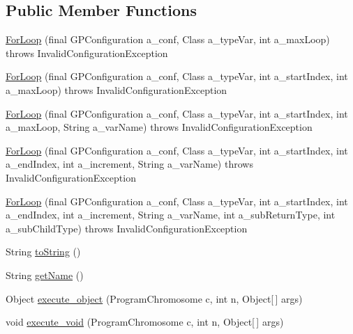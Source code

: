 \subsection*{Public Member Functions}
\begin{DoxyCompactItemize}
\item 
\hyperlink{classorg_1_1jgap_1_1gp_1_1function_1_1_for_loop_a3e802fb1995150059fbb2ac6d8661cb0}{For\-Loop} (final G\-P\-Configuration a\-\_\-conf, Class a\-\_\-type\-Var, int a\-\_\-max\-Loop)  throws Invalid\-Configuration\-Exception 
\item 
\hyperlink{classorg_1_1jgap_1_1gp_1_1function_1_1_for_loop_a634098a0999d8b32e74b2c2cf35bb353}{For\-Loop} (final G\-P\-Configuration a\-\_\-conf, Class a\-\_\-type\-Var, int a\-\_\-start\-Index, int a\-\_\-max\-Loop)  throws Invalid\-Configuration\-Exception 
\item 
\hyperlink{classorg_1_1jgap_1_1gp_1_1function_1_1_for_loop_a752407b157c1e04b58d9743bcadde2b2}{For\-Loop} (final G\-P\-Configuration a\-\_\-conf, Class a\-\_\-type\-Var, int a\-\_\-start\-Index, int a\-\_\-max\-Loop, String a\-\_\-var\-Name)  throws Invalid\-Configuration\-Exception 
\item 
\hyperlink{classorg_1_1jgap_1_1gp_1_1function_1_1_for_loop_ad249a72ef77469b96c7dabcb3706d10a}{For\-Loop} (final G\-P\-Configuration a\-\_\-conf, Class a\-\_\-type\-Var, int a\-\_\-start\-Index, int a\-\_\-end\-Index, int a\-\_\-increment, String a\-\_\-var\-Name)  throws Invalid\-Configuration\-Exception 
\item 
\hyperlink{classorg_1_1jgap_1_1gp_1_1function_1_1_for_loop_a5fb50554a8ba24d921548e060da25860}{For\-Loop} (final G\-P\-Configuration a\-\_\-conf, Class a\-\_\-type\-Var, int a\-\_\-start\-Index, int a\-\_\-end\-Index, int a\-\_\-increment, String a\-\_\-var\-Name, int a\-\_\-sub\-Return\-Type, int a\-\_\-sub\-Child\-Type)  throws Invalid\-Configuration\-Exception 
\item 
String \hyperlink{classorg_1_1jgap_1_1gp_1_1function_1_1_for_loop_a5bd733832132a2c08209b25ca04960e6}{to\-String} ()
\item 
String \hyperlink{classorg_1_1jgap_1_1gp_1_1function_1_1_for_loop_a1032b4f961528349367048fd7a95a26f}{get\-Name} ()
\item 
Object \hyperlink{classorg_1_1jgap_1_1gp_1_1function_1_1_for_loop_aae84fa32362730f6933ec7b98b495aa1}{execute\-\_\-object} (Program\-Chromosome c, int n, Object\mbox{[}$\,$\mbox{]} args)
\item 
void \hyperlink{classorg_1_1jgap_1_1gp_1_1function_1_1_for_loop_a403722d822eb393663d4551bbdb900e1}{execute\-\_\-void} (Program\-Chromosome c, int n, Object\mbox{[}$\,$\mbox{]} args)

\end{DoxyCompactItemize}
